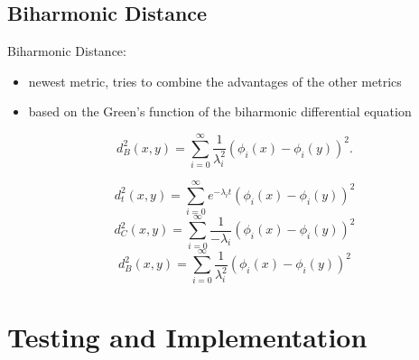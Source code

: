 \documentclass[]{beamer}
\begin{document}
\subsection{Biharmonic Distance}
	\begin{frame}
		Biharmonic Distance:\\
		\begin{itemize}
			\item newest metric, tries to combine the advantages of the other metrics
			\item based on the Green's function of the biharmonic differential equation
		\end{itemize}
		$$ d_B^2(x,y) = \sum_{i=0}^{\infty}  \frac{1}{\lambda_i^2}(\phi_i(x) - \phi_i(y))^2. $$

	\end{frame}

	\begin{frame}
		$$ d_t^2(x,y) = \sum_{i=0}^{\infty} e^{-\lambda_i t} (\phi_i(x) - \phi_i(y))^2 $$
		$$ d_C^2(x,y) = \sum_{i=0}^{\infty}  \frac{1}{-\lambda_i}(\phi_i(x) - \phi_i(y))^2 $$
		$$ d_B^2(x,y) = \sum_{i=0}^{\infty}  \frac{1}{\lambda_i^2}(\phi_i(x) - \phi_i(y))^2 $$
	\end{frame}

\section{Testing and Implementation}
\end{document}
